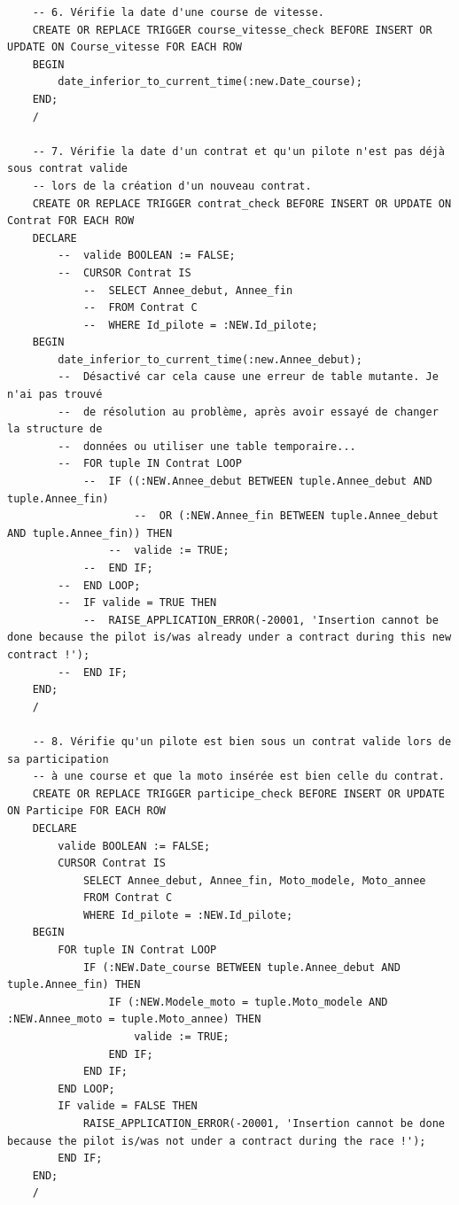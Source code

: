 \documentclass[12pt,a4paper]{article}
\newenvironment{code}{\captionsetup{type=listing}}{}
\begin{document}
\begin{code}
\begin{verbatim}
    -- 6. Vérifie la date d'une course de vitesse.
    CREATE OR REPLACE TRIGGER course_vitesse_check BEFORE INSERT OR UPDATE ON Course_vitesse FOR EACH ROW
    BEGIN
        date_inferior_to_current_time(:new.Date_course);
    END;
    /

    -- 7. Vérifie la date d'un contrat et qu'un pilote n'est pas déjà sous contrat valide
    -- lors de la création d'un nouveau contrat.
    CREATE OR REPLACE TRIGGER contrat_check BEFORE INSERT OR UPDATE ON Contrat FOR EACH ROW
    DECLARE
        --  valide BOOLEAN := FALSE;
        --  CURSOR Contrat IS
            --  SELECT Annee_debut, Annee_fin
            --  FROM Contrat C
            --  WHERE Id_pilote = :NEW.Id_pilote;
    BEGIN
        date_inferior_to_current_time(:new.Annee_debut);
        --  Désactivé car cela cause une erreur de table mutante. Je n'ai pas trouvé
        --  de résolution au problème, après avoir essayé de changer la structure de
        --  données ou utiliser une table temporaire...
        --  FOR tuple IN Contrat LOOP
            --  IF ((:NEW.Annee_debut BETWEEN tuple.Annee_debut AND tuple.Annee_fin)
                    --  OR (:NEW.Annee_fin BETWEEN tuple.Annee_debut AND tuple.Annee_fin)) THEN
                --  valide := TRUE;
            --  END IF;
        --  END LOOP;
        --  IF valide = TRUE THEN
            --  RAISE_APPLICATION_ERROR(-20001, 'Insertion cannot be done because the pilot is/was already under a contract during this new contract !');
        --  END IF;
    END;
    /

    -- 8. Vérifie qu'un pilote est bien sous un contrat valide lors de sa participation
    -- à une course et que la moto insérée est bien celle du contrat.
    CREATE OR REPLACE TRIGGER participe_check BEFORE INSERT OR UPDATE ON Participe FOR EACH ROW
    DECLARE
        valide BOOLEAN := FALSE;
        CURSOR Contrat IS
            SELECT Annee_debut, Annee_fin, Moto_modele, Moto_annee
            FROM Contrat C
            WHERE Id_pilote = :NEW.Id_pilote;
    BEGIN
        FOR tuple IN Contrat LOOP
            IF (:NEW.Date_course BETWEEN tuple.Annee_debut AND tuple.Annee_fin) THEN
                IF (:NEW.Modele_moto = tuple.Moto_modele AND :NEW.Annee_moto = tuple.Moto_annee) THEN
                    valide := TRUE;
                END IF;
            END IF;
        END LOOP;
        IF valide = FALSE THEN
            RAISE_APPLICATION_ERROR(-20001, 'Insertion cannot be done because the pilot is/was not under a contract during the race !');
        END IF;
    END;
    /


\end{verbatim}
\end{code}
\end{document}
